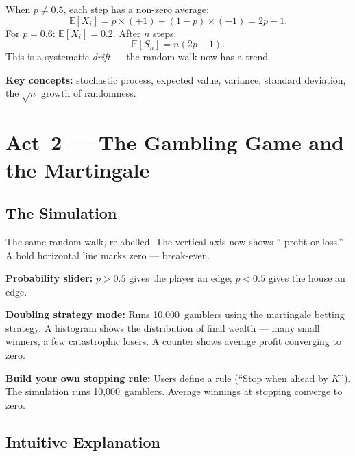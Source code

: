 \documentclass[12pt, a4paper]{article}
\newcommand{\E}{\mathbb{E}}            %
\begin{document}
When $p \neq 0.5$, each step has a non-zero average:
\[
  \E[X_i] = p \times (+1) + (1-p) \times (-1) = 2p - 1.
\]
For $p = 0.6$: $\E[X_i] = 0.2$.  After $n$ steps:
\[
  \E[S_n] = n(2p-1).
\]
This is a systematic \emph{drift} --- the random walk now has a trend.

\begin{keytakeaway}
\textbf{Key concepts:} stochastic process, expected value, variance, standard
deviation, the $\sqrt{n}$ growth of randomness.
\end{keytakeaway}


\newpage
\section{Act~2 --- The Gambling Game and the Martingale}

\subsection{The Simulation}

\begin{simulation}
The same random walk, relabelled.  The vertical axis now shows
``\texteuro{} profit or loss.''  A bold horizontal line marks zero ---
break-even.

\textbf{Probability slider:} $p > 0.5$ gives the player an edge;
$p < 0.5$ gives the house an edge.

\textbf{Doubling strategy mode:} Runs 10,000~gamblers using the martingale
betting strategy.  A histogram shows the distribution of final wealth --- many
small winners, a few catastrophic losers.  A counter shows average profit
converging to zero.

\textbf{Build your own stopping rule:} Users define a rule (``Stop when ahead
by \texteuro$K$'').  The simulation runs 10,000~gamblers.  Average winnings at
stopping converge to zero.
\end{simulation}

\subsection{Intuitive Explanation}
\end{document}
